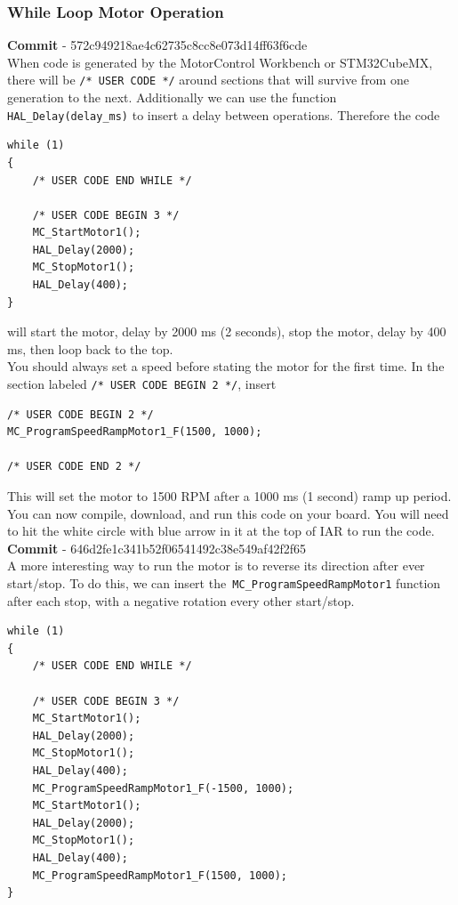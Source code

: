 \documentclass[10pt]{article}
\begin{document}
			\FloatBarrier \subsubsection{While Loop Motor Operation}
                    \textbf{Commit} - 572c949218ae4c62735c8cc8e073d14ff63f6cde \\
                When code is generated by the MotorControl Workbench or STM32CubeMX, there will be \texttt{/* USER CODE */} around sections that will survive from one generation to the next. Additionally we can use the function \texttt{HAL\_Delay(delay\_ms)} to insert a delay between operations. Therefore the code 
                \begin{verbatim}
while (1)
{
    /* USER CODE END WHILE */

    /* USER CODE BEGIN 3 */
    MC_StartMotor1();
    HAL_Delay(2000);
    MC_StopMotor1();
    HAL_Delay(400);
}
                \end{verbatim}
                will start the motor, delay by 2000 ms (2 seconds), stop the motor, delay by 400 ms, then loop back to the top. \\ 
                You should always set a speed before stating the motor for the first time. In the section labeled \texttt{/* USER CODE BEGIN 2 */}, insert
                \begin{verbatim}
/* USER CODE BEGIN 2 */
MC_ProgramSpeedRampMotor1_F(1500, 1000);

/* USER CODE END 2 */
                \end{verbatim}
                This will set the motor to 1500 RPM after a 1000 ms (1 second) ramp up period. You can now compile, download, and run this code on your board. You will need to hit the white circle with blue arrow in it at the top of IAR to run the code. \\ 
                \textbf{Commit} - 646d2fe1c341b52f06541492c38e549af42f2f65 \\
                A more interesting way to run the motor is to reverse its direction after ever start/stop. To do this, we can insert the\texttt{ MC\_ProgramSpeedRampMotor1} function after each stop, with a negative rotation every other start/stop.
                \begin{verbatim}
while (1)
{
    /* USER CODE END WHILE */

    /* USER CODE BEGIN 3 */
    MC_StartMotor1();
    HAL_Delay(2000);
    MC_StopMotor1();
    HAL_Delay(400);
    MC_ProgramSpeedRampMotor1_F(-1500, 1000);
    MC_StartMotor1();
    HAL_Delay(2000);
    MC_StopMotor1();
    HAL_Delay(400);
    MC_ProgramSpeedRampMotor1_F(1500, 1000);
}
                \end{verbatim}
\end{document}
